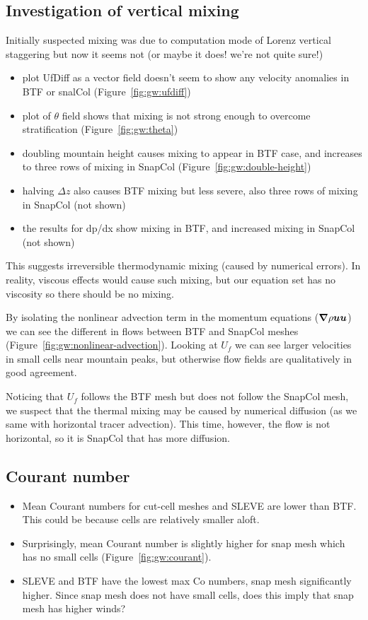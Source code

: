 \subsection{Investigation of vertical mixing}
Initially suspected mixing was due to computation mode of Lorenz vertical staggering but now it seems not (or maybe it does! we're not quite sure!)
\begin{itemize}
	\item plot UfDiff as a vector field doesn't seem to show any velocity anomalies in BTF or snalCol (Figure~\ref{fig:gw:ufdiff})
	\item plot of $\theta$ field shows that mixing is not strong enough to overcome stratification (Figure~\ref{fig:gw:theta})
	\item doubling mountain height causes mixing to appear in BTF case, and increases to three rows of mixing in SnapCol (Figure~\ref{fig:gw:double-height})
	\item halving $\Delta z$ also causes BTF mixing but less severe, also three rows of mixing in SnapCol (not shown)
	\item the results for dp/dx show mixing in BTF, and increased mixing in SnapCol (not shown)
\end{itemize}


This suggests irreversible thermodynamic mixing (caused by numerical errors).  In reality, viscous effects would cause such mixing, but our equation set has no viscosity so there should be no mixing.

By isolating the nonlinear advection term in the momentum equations ($\boldsymbol{\nabla} \rho \bm{u} \bm{u}$) we can see the different in flows between BTF and SnapCol meshes (Figure~\ref{fig:gw:nonlinear-advection}).  Looking at $U_f$ we can see larger velocities in small cells near mountain peaks, but otherwise flow fields are qualitatively in good agreement.

Noticing that $U_f$ follows the BTF mesh but does not follow the SnapCol mesh, we suspect that the thermal mixing may be caused by numerical diffusion (as we same with horizontal tracer advection).  This time, however, the flow is not horizontal, so it is SnapCol that has more diffusion.

\subsection{Courant number}

\begin{itemize}
	\item Mean Courant numbers for cut-cell meshes and SLEVE are lower than BTF.  This could be because cells are relatively smaller aloft.
	\item Surprisingly, mean Courant number is slightly higher for snap mesh which has no small cells (Figure~\ref{fig:gw:courant}).
	\item SLEVE and BTF have the lowest max Co numbers, snap mesh significantly higher.  Since snap mesh does not have small cells, does this imply that snap mesh has higher winds?
\end{itemize}

